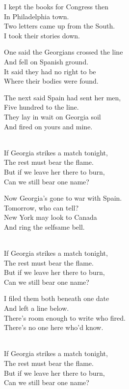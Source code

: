 \begin{lyrics}
I kept the books for Congress then\\
In Philadelphia town.\\
Two letters came up from the South.\\
I took their stories down.

One said the Georgians crossed the line\\
And fell on Spanish ground.\\
It said they had no right to be\\
Where their bodies were found.

The next said Spain had sent her men,\\
Five hundred to the line.\\
They lay in wait on Georgia soil\\
And fired on yours and mine.

\\
If Georgia strikes a match tonight,\\
The rest must bear the flame.\\
But if we leave her there to burn,\\
Can we still bear one name?


Now Georgia’s gone to war with Spain.\\
Tomorrow, who can tell?\\
New York may look to Canada\\
And ring the selfsame bell.

\\
If Georgia strikes a match tonight,\\
The rest must bear the flame.\\
But if we leave her there to burn,\\
Can we still bear one name?

I filed them both beneath one date\\
And left a line below.\\
There’s room enough to write who fired.\\
There’s no one here who’d know.

\\
If Georgia strikes a match tonight,\\
The rest must bear the flame.\\
But if we leave her there to burn,\\
Can we still bear one name?
\end{lyrics}

